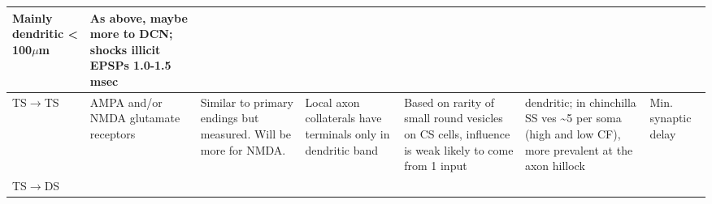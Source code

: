 \documentclass[10pt,a4paper]{article}
\newcommand{\um}{$\mu$m}
\begin{document}
\begin{landscape}
\begin{supertabular}{|m{2.121cm}|m{2.899cm}|m{2.243cm}|m{2.986cm}|m{2.294cm}|m{2.245cm}|m{3.303cm}|}
Mainly dendritic {\textless} 100\um
 \citep{Alibardi:1999,Liberman:1993,RubioJuiz:2004,SpirouDavisEtAl:1999}  & As
above, maybe more to DCN; shocks illicit EPSPs 1.0-1.5 msec
\citep{ZhangOertel:1993}\\\hline
                      TS\ensuremath{\rightarrow}TS                        & AMPA and/or
       NMDA glutamate receptors \citep{FerragamoGoldingEtAl:1998a}        & Similar to
          primary endings but measured.  Will be more for NMDA.           & Local axon
collaterals have terminals only in dendritic band \citep{SmithRhode:1989} & 
Based on rarity of small round vesicles on CS cells, influence is weak
\citep{SmithRhode:1989} likely to come from 1 input
                   \citep{FerragamoGoldingEtAl:1998a}                     & dendritic; \citep{JosephsonMorest:1998}
in chinchilla SS ves \~{}5 per soma (high and low CF), more prevalent at the
                              axon hillock                                & Min. synaptic delay \\\hline
                      TS\ensuremath{\rightarrow}DS                        & 


\end{supertabular}
\end{landscape}
\end{document}
